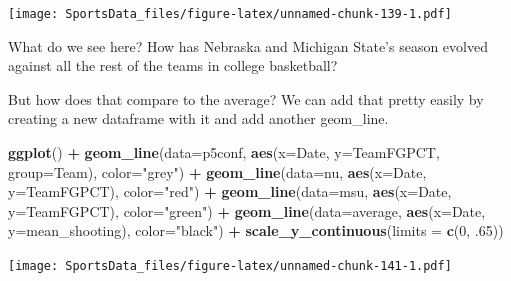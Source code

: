 \documentclass[]{book}
\newenvironment{Shaded}{\begin{snugshade}}{\end{snugshade}}
\newcommand{\DataTypeTok}[1]{\textcolor[rgb]{0.13,0.29,0.53}{#1}}
\newcommand{\DecValTok}[1]{\textcolor[rgb]{0.00,0.00,0.81}{#1}}
\newcommand{\FloatTok}[1]{\textcolor[rgb]{0.00,0.00,0.81}{#1}}
\newcommand{\KeywordTok}[1]{\textcolor[rgb]{0.13,0.29,0.53}{\textbf{#1}}}
\newcommand{\NormalTok}[1]{#1}
\newcommand{\OperatorTok}[1]{\textcolor[rgb]{0.81,0.36,0.00}{\textbf{#1}}}
\newcommand{\StringTok}[1]{\textcolor[rgb]{0.31,0.60,0.02}{#1}}
\begin{document}
\texttt{[image: SportsData\_files/figure-latex/unnamed-chunk-139-1.pdf]}

What do we see here? How has Nebraska and Michigan State's season evolved against all the rest of the teams in college basketball?

But how does that compare to the average? We can add that pretty easily by creating a new dataframe with it and add another geom\_line.

\begin{Shaded}
\end{Shaded}

\begin{Shaded}
\begin{Highlighting}[]
\KeywordTok{ggplot}\NormalTok{() }\OperatorTok{+}\StringTok{ }\KeywordTok{geom_line}\NormalTok{(}\DataTypeTok{data=}\NormalTok{p5conf, }\KeywordTok{aes}\NormalTok{(}\DataTypeTok{x=}\NormalTok{Date, }\DataTypeTok{y=}\NormalTok{TeamFGPCT, }\DataTypeTok{group=}\NormalTok{Team), }\DataTypeTok{color=}\StringTok{"grey"}\NormalTok{) }\OperatorTok{+}\StringTok{ }\KeywordTok{geom_line}\NormalTok{(}\DataTypeTok{data=}\NormalTok{nu, }\KeywordTok{aes}\NormalTok{(}\DataTypeTok{x=}\NormalTok{Date, }\DataTypeTok{y=}\NormalTok{TeamFGPCT), }\DataTypeTok{color=}\StringTok{"red"}\NormalTok{) }\OperatorTok{+}\StringTok{ }\KeywordTok{geom_line}\NormalTok{(}\DataTypeTok{data=}\NormalTok{msu, }\KeywordTok{aes}\NormalTok{(}\DataTypeTok{x=}\NormalTok{Date, }\DataTypeTok{y=}\NormalTok{TeamFGPCT), }\DataTypeTok{color=}\StringTok{"green"}\NormalTok{) }\OperatorTok{+}\StringTok{ }\KeywordTok{geom_line}\NormalTok{(}\DataTypeTok{data=}\NormalTok{average, }\KeywordTok{aes}\NormalTok{(}\DataTypeTok{x=}\NormalTok{Date, }\DataTypeTok{y=}\NormalTok{mean_shooting), }\DataTypeTok{color=}\StringTok{"black"}\NormalTok{) }\OperatorTok{+}\StringTok{ }\KeywordTok{scale_y_continuous}\NormalTok{(}\DataTypeTok{limits =} \KeywordTok{c}\NormalTok{(}\DecValTok{0}\NormalTok{, }\FloatTok{.65}\NormalTok{))}
\end{Highlighting}
\end{Shaded}

\texttt{[image: SportsData\_files/figure-latex/unnamed-chunk-141-1.pdf]}
\end{document}

